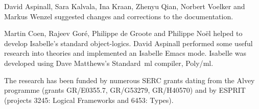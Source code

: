 David Aspinall, Sara Kalvala, Ina Kraan, Zhenyu Qian, Norbert Voelker and
Markus Wenzel suggested changes and corrections to the documentation.

Martin Coen, Rajeev Gor\'e, Philippe de Groote and Philippe No\"el helped
to develop Isabelle's standard object-logics.  David Aspinall performed
some useful research into theories and implemented an Isabelle Emacs mode.
Isabelle was developed using Dave Matthews's Standard~{\sc ml} compiler,
Poly/{\sc ml}.  

The research has been funded by numerous SERC grants dating from the Alvey
programme (grants GR/E0355.7, GR/G53279, GR/H40570) and by ESPRIT (projects
3245: Logical Frameworks and 6453: Types).


